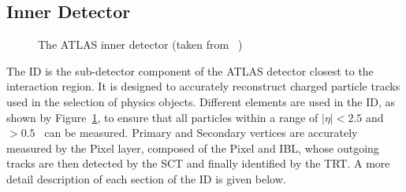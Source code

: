 	\subsection{Inner Detector}
	\label{subsec:id}
	\begin{figure}[!hbt]
		\begin{center}
		\end{center}
		\caption{The \ac{ATLAS} inner detector (taken from ~\cite{ATLASPhotos})}
		\label{fig:ID}
		\end{figure}
	The \ac{ID} is the sub-detector component of the \ac{ATLAS} detector closest to the interaction region. 
	It is designed to accurately reconstruct charged particle tracks used in the selection of physics objects.
	Different elements are used in the \ac{ID}, as shown by Figure~\ref{fig:ID}, to ensure that all particles within a range of $|\eta|<2.5$ and \pt\ $>0.5$ \gev\ can be measured. 
	Primary and Secondary vertices are accurately measured by the Pixel layer, composed of the \ac{Pixel} and \ac{IBL}, whose outgoing tracks are then detected by the \ac{SCT} and finally identified by the \ac{TRT}. 
	A more detail description of each section of the \ac{ID} is given below.
